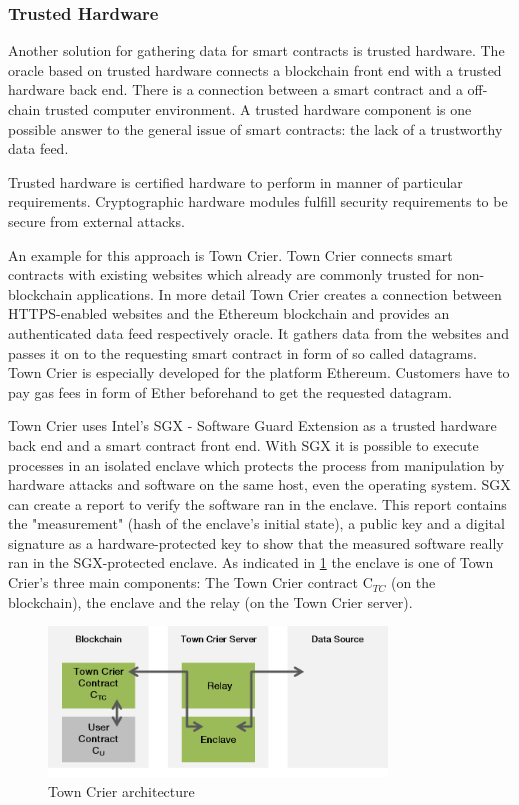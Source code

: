 \documentclass[conference]{IEEEtran}
\begin{document}
\subsubsection{Trusted Hardware}
Another solution for gathering data for smart contracts is trusted hardware. The oracle based on trusted hardware connects a blockchain front end with a trusted hardware back end. There is a connection between a smart contract and a off-chain trusted computer environment. A trusted hardware component is one possible answer to the general issue of smart contracts: the lack of a trustworthy data feed. \cite{Zhang2016} \par 
Trusted hardware is certified hardware to perform in manner of particular requirements. Cryptographic hardware modules fulfill security requirements to be secure from external attacks. \cite{Sion2009} \par 
An example for this approach is Town Crier. Town Crier connects smart contracts with existing websites which already are commonly trusted for non-blockchain applications. In more detail Town Crier creates a connection between HTTPS-enabled websites and the Ethereum blockchain and provides an authenticated data feed respectively oracle. It gathers data from the websites and passes it on to the requesting smart contract in form of so called datagrams. Town Crier is especially developed for the platform Ethereum. Customers have to pay gas fees in form of Ether beforehand to get the requested datagram. \cite{Zhang2016} \par 
Town Crier uses Intel’s SGX - Software Guard Extension as a trusted hardware back end and a smart contract front end. With SGX it is possible to execute processes in an isolated enclave which protects the process from manipulation by hardware attacks and software on the same host, even the operating system. SGX can create a report to verify the software ran in the enclave. This report contains the "measurement" (hash of the enclave's initial state), a public key and a digital signature as a hardware-protected key to show that the measured software really ran in the SGX-protected enclave. As indicated in \ref{towncrier} the enclave is one of Town Crier's three main components: The Town Crier contract C$_{TC}$ (on the blockchain), the enclave and the relay (on the Town Crier server). 
\begin{figure}[h]
	\begin{center}
		\includegraphics[width=9cm]{TownCrier.png}
		\caption{Town Crier architecture}
		\label{towncrier}
	\end{center}
\end{figure}
\end{document}
